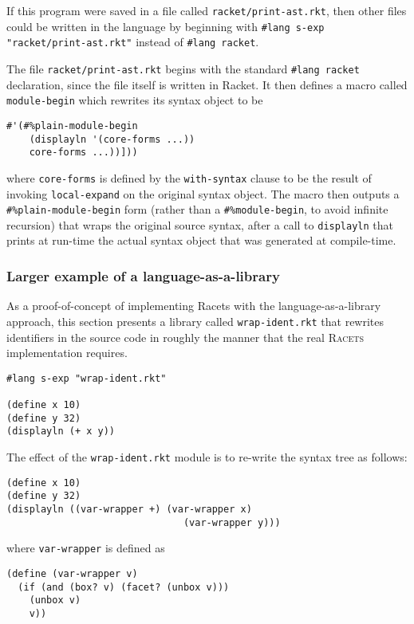 \documentclass{article}
\begin{document}
If this program were saved in a file called \texttt{racket/print-ast.rkt}, then other files could be written in the language by beginning with \texttt{\#lang s-exp "racket/print-ast.rkt"} instead of \texttt{\#lang racket}.

The file \texttt{racket/print-ast.rkt} begins with the standard \texttt{\#lang racket} declaration, since the file itself is written in Racket. It then defines a macro called \texttt{module-begin} which rewrites its syntax object to be

\begin{lstlisting}
#'(#%plain-module-begin
    (displayln '(core-forms ...))
    core-forms ...))]))
\end{lstlisting}

where \texttt{core-forms} is defined by the \texttt{with-syntax} clause to be the result of invoking \texttt{local-expand} on the original syntax object. The macro then outputs a \texttt{\#\%plain-module-begin} form (rather than a \texttt{\#\%module-begin}, to avoid infinite recursion) that wraps the original source syntax, after a call to \texttt{displayln} that prints at run-time the actual syntax object that was generated at compile-time.


\subsubsection{Larger example of a language-as-a-library}
As a proof-of-concept of implementing Racets with the language-as-a-library approach, this section presents a library called \texttt{wrap-ident.rkt} that rewrites identifiers in the source code in roughly the manner that the real \textsc{Racets} implementation requires.

\begin{lstlisting}
#lang s-exp "wrap-ident.rkt"

(define x 10)
(define y 32)
(displayln (+ x y))
\end{lstlisting}

The effect of the \texttt{wrap-ident.rkt} module is to re-write the syntax tree as follows:

\begin{lstlisting}
(define x 10)
(define y 32)
(displayln ((var-wrapper +) (var-wrapper x)
                               (var-wrapper y)))
\end{lstlisting}

where \texttt{var-wrapper} is defined as

\begin{lstlisting}
(define (var-wrapper v)
  (if (and (box? v) (facet? (unbox v)))
    (unbox v)
    v))
\end{lstlisting}
\end{document}
